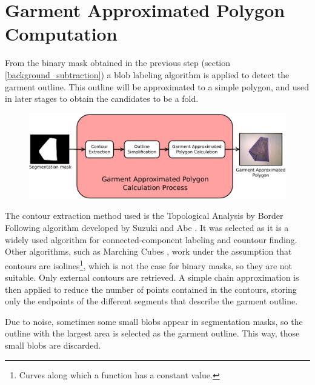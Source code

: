 \section{Garment Approximated Polygon Computation}
\label{segmentation_approximated_polygon}
From the binary mask obtained in the previous step (section \ref{background_subtraction}) a blob labeling algorithm is applied to detect the garment outline. This outline will be approximated to a simple polygon, and used in later stages to obtain the candidates to be a fold.

\begin{figure}[thpb]
    \centering
    \includegraphics[width=\textwidth]
    {figures/Garment-polygon-diagram.pdf}
    \caption{}
    \label{fig:garment_polygon_processes}
\end{figure}

The contour extraction method used is the Topological Analysis by Border Following algorithm developed by Suzuki and Abe  {}. It was selected as it is a widely used algorithm for connected-component labeling and countour finding. Other algorithms, such as Marching Cubes , work under the assumption that contours are isolines\footnote{Curves along which a  function has a constant value.}, which is not the case for binary masks, so they are not suitable. Only external contours are retrieved. A simple chain approximation is then applied to reduce the number of points contained in the contours, storing only the endpoints of the different segments that describe the garment outline.

Due to noise, sometimes some small blobs appear in segmentation masks, so the outline with the largest area is selected as the garment outline. This way, those small blobs are discarded.

